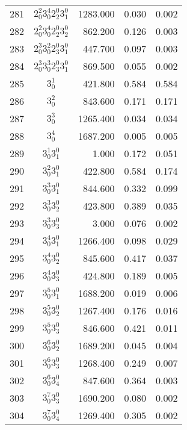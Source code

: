 \documentclass{revtex4}
\begin{document}
\begin{table}
\begin{tabular}{rcrrr}
281&$2_0^2 3_0^4 2_2^0 3_1^0$& 1283.000& 0.030& 0.002\\
282&$2_0^2 3_0^4 2_2^0 3_2^0$& 862.200& 0.126& 0.003\\
283&$2_0^3 3_0^2 2_3^0 3_1^0$& 447.700& 0.097& 0.003\\
284&$2_0^3 3_0^3 2_3^0 3_1^0$& 869.500& 0.055& 0.002\\
285&$3_0^1$& 421.800& 0.584& 0.584\\
286&$3_0^2$& 843.600& 0.171& 0.171\\
287&$3_0^3$& 1265.400& 0.034& 0.034\\
288&$3_0^4$& 1687.200& 0.005& 0.005\\
289&$3_0^1 3_1^0$& 1.000& 0.172& 0.051\\
290&$3_0^2 3_1^0$& 422.800& 0.584& 0.174\\
291&$3_0^3 3_1^0$& 844.600& 0.332& 0.099\\
292&$3_0^3 3_2^0$& 423.800& 0.389& 0.035\\
293&$3_0^3 3_3^0$& 3.000& 0.076& 0.002\\
294&$3_0^4 3_1^0$& 1266.400& 0.098& 0.029\\
295&$3_0^4 3_2^0$& 845.600& 0.417& 0.037\\
296&$3_0^4 3_3^0$& 424.800& 0.189& 0.005\\
297&$3_0^5 3_1^0$& 1688.200& 0.019& 0.006\\
298&$3_0^5 3_2^0$& 1267.400& 0.176& 0.016\\
299&$3_0^5 3_3^0$& 846.600& 0.421& 0.011\\
300&$3_0^6 3_2^0$& 1689.200& 0.045& 0.004\\
301&$3_0^6 3_3^0$& 1268.400& 0.249& 0.007\\
302&$3_0^6 3_4^0$& 847.600& 0.364& 0.003\\
303&$3_0^7 3_3^0$& 1690.200& 0.080& 0.002\\
304&$3_0^7 3_4^0$& 1269.400& 0.305& 0.002\\
\end{tabular}
\end{table}
\end{document}
